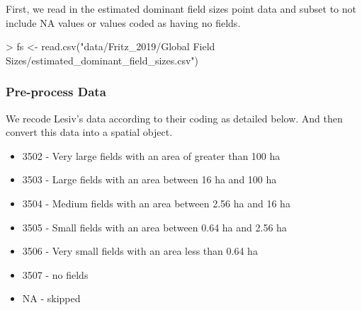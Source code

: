 \documentclass{article}
\begin{document}
First, we read in the estimated dominant field sizes point data and subset to not include NA values or values coded as having no fields.
\begin{Schunk}
\begin{Sinput}
> fs <- read.csv("data/Fritz_2019/Global Field Sizes/estimated_dominant_field_sizes.csv")
\end{Sinput}
\end{Schunk}

\subsubsection{Pre-process Data}

We recode Lesiv's data according to their coding as detailed below. And then convert this data into a spatial object.

\begin{itemize}
  \item 3502 - Very large fields with an area of greater than 100 ha
  \item 3503 - Large fields with an area between 16 ha and 100 ha
  \item 3504 - Medium fields with an area between 2.56 ha and 16 ha
  \item 3505 - Small fields with an area between 0.64 ha and 2.56 ha
  \item 3506 - Very small fields with an area less than 0.64 ha
  \item 3507 - no fields
  \item NA - skipped
\end{itemize}

\begin{Schunk}
\end{Schunk}
\end{document}
